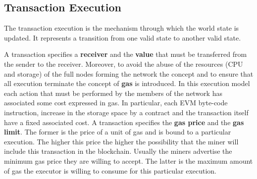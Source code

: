 \subsection{Transaction Execution}
The transaction execution is the mechanism through which the world state is
updated. It represents a transition from one
valid state to another valid state.

A transaction specifies a \textbf{receiver} and the \textbf{value} that must be
transferred from the sender to the receiver.
Moreover, to avoid the abuse of the resources
(CPU and storage) of the full nodes forming the network the concept and to
ensure that all execution terminate the concept of \textbf{gas} is introduced.
In this execution model each action that must be performed by the members
of the network has associated some cost expressed in gas.
In particular, each EVM byte-code instruction, increase in the storage
space by a contract and the transaction itself have a fixed associated cost.
A transaction specifies the \textbf{gas price} and the \textbf{gas limit}. 
The former is the price of a unit of gas and is bound to a particular execution.
The higher this price the higher the
possibility that the miner will include this transaction in the blockchain.
Usually the miners advertise the minimum gas price they are willing to accept.
The latter is the maximum amount of gas the executor is willing to consume for
this particular execution.

